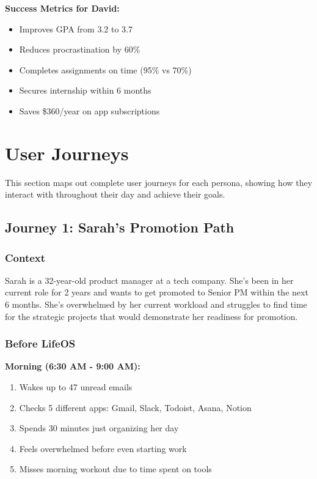 \textbf{Success Metrics for David:}

\begin{itemize}
    \item Improves GPA from 3.2 to 3.7
    \item Reduces procrastination by 60\%
    \item Completes assignments on time (95\% vs 70\%)
    \item Secures internship within 6 months
    \item Saves \$360/year on app subscriptions
\end{itemize}

\section{User Journeys}

This section maps out complete user journeys for each persona, showing how they interact with \lifeos{} throughout their day and achieve their goals.

\subsection{Journey 1: Sarah's Promotion Path}

\subsubsection{Context}

Sarah is a 32-year-old product manager at a tech company. She's been in her current role for 2 years and wants to get promoted to Senior PM within the next 6 months. She's overwhelmed by her current workload and struggles to find time for the strategic projects that would demonstrate her readiness for promotion.

\subsubsection{Before LifeOS}

\textbf{Morning (6:30 AM - 9:00 AM):}
\begin{enumerate}
    \item Wakes up to 47 unread emails
    \item Checks 5 different apps: Gmail, Slack, Todoist, Asana, Notion
    \item Spends 30 minutes just organizing her day
    \item Feels overwhelmed before even starting work
    \item Misses morning workout due to time spent on tools
\end{enumerate}

